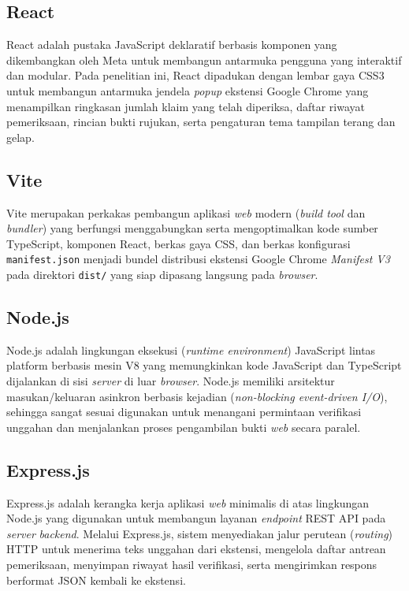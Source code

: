 \documentclass[12pt,a4paper,twoside]{report}
\begin{document}
\subsection{React}

React adalah pustaka JavaScript deklaratif berbasis komponen yang dikembangkan oleh Meta untuk membangun antarmuka pengguna yang interaktif dan modular. Pada penelitian ini, React dipadukan dengan lembar gaya CSS3 untuk membangun antarmuka jendela \textit{popup} ekstensi Google Chrome yang menampilkan ringkasan jumlah klaim yang telah diperiksa, daftar riwayat pemeriksaan, rincian bukti rujukan, serta pengaturan tema tampilan terang dan gelap.

\subsection{Vite}

Vite merupakan perkakas pembangun aplikasi \textit{web} modern (\textit{build tool} dan \textit{bundler}) yang berfungsi menggabungkan serta mengoptimalkan kode sumber TypeScript, komponen React, berkas gaya CSS, dan berkas konfigurasi \texttt{manifest.json} menjadi bundel distribusi ekstensi Google Chrome \textit{Manifest V3} pada direktori \texttt{dist/} yang siap dipasang langsung pada \textit{browser}.

\subsection{Node.js}

Node.js adalah lingkungan eksekusi (\textit{runtime environment}) JavaScript lintas platform berbasis mesin V8 yang memungkinkan kode JavaScript dan TypeScript dijalankan di sisi \textit{server} di luar \textit{browser}. Node.js memiliki arsitektur masukan/keluaran asinkron berbasis kejadian (\textit{non-blocking event-driven I/O}), sehingga sangat sesuai digunakan untuk menangani permintaan verifikasi unggahan dan menjalankan proses pengambilan bukti \textit{web} secara paralel.

\subsection{Express.js}

Express.js adalah kerangka kerja aplikasi \textit{web} minimalis di atas lingkungan Node.js yang digunakan untuk membangun layanan \textit{endpoint} REST API pada \textit{server} \textit{backend}. Melalui Express.js, sistem menyediakan jalur perutean (\textit{routing}) HTTP untuk menerima teks unggahan dari ekstensi, mengelola daftar antrean pemeriksaan, menyimpan riwayat hasil verifikasi, serta mengirimkan respons berformat JSON kembali ke ekstensi.
\end{document}
